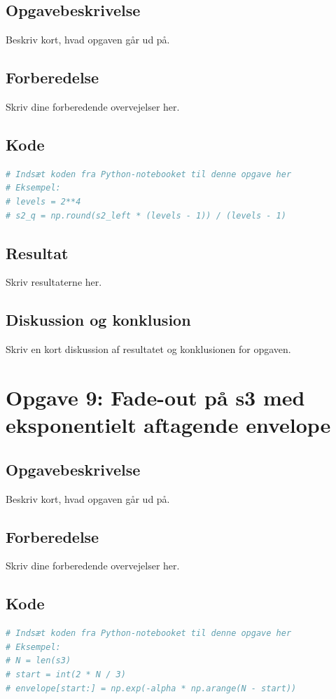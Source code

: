 ﻿\documentclass[11pt,a4paper]{report}
\begin{document}
\subsection{Opgavebeskrivelse}
Beskriv kort, hvad opgaven går ud på.

\subsection{Forberedelse}
Skriv dine forberedende overvejelser her.

\subsection{Kode}
\begin{lstlisting}[language=Python]
# Indsæt koden fra Python-notebooket til denne opgave her
# Eksempel:
# levels = 2**4
# s2_q = np.round(s2_left * (levels - 1)) / (levels - 1)
\end{lstlisting}

\subsection{Resultat}
Skriv resultaterne her.

\subsection{Diskussion og konklusion}
Skriv en kort diskussion af resultatet og konklusionen for opgaven.

\newpage

\section{Opgave 9: Fade-out på s3 med eksponentielt aftagende envelope}
\subsection{Opgavebeskrivelse}
Beskriv kort, hvad opgaven går ud på.

\subsection{Forberedelse}
Skriv dine forberedende overvejelser her.

\subsection{Kode}
\begin{lstlisting}[language=Python]
# Indsæt koden fra Python-notebooket til denne opgave her
# Eksempel:
# N = len(s3)
# start = int(2 * N / 3)
# envelope[start:] = np.exp(-alpha * np.arange(N - start))
\end{lstlisting}
\end{document}
